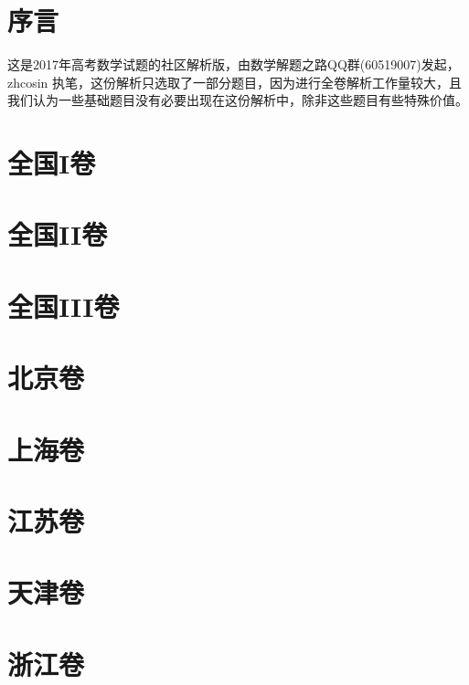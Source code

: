 \documentclass{ctexart}
\title{\kaishu{2017年高考数学试题选析}}
\author{数学解题之路QQ群(60519007)}
\date{更新于: \today}
\begin{document}
\maketitle

\tableofcontents

\section{序言}
\label{sec:preface}

这是2017年高考数学试题的社区解析版，由数学解题之路QQ群(60519007)发起，zhcosin 执笔，这份解析只选取了一部分题目，因为进行全卷解析工作量较大，且我们认为一些基础题目没有必要出现在这份解析中，除非这些题目有些特殊价值。

\section{全国I卷}
\label{sec:nation-1}

\section{全国II卷}
\label{sec:nation-2}

\section{全国III卷}
\label{sec:nation-3}

\section{北京卷}
\label{sec:beijing}

\section{上海卷}
\label{sec:shanghai}

\section{江苏卷}
\label{sec:jiangshu}

\section{天津卷}
\label{sec:tianjin}

\section{浙江卷}
\label{sec:zhejiang}
\end{document}
